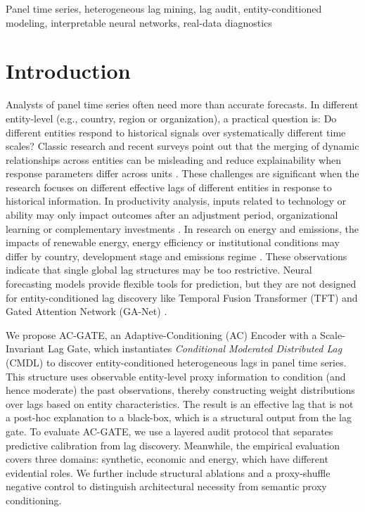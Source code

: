 \documentclass[conference]{IEEEtran}
\begin{document}
\begin{IEEEkeywords}
Panel time series, heterogeneous lag mining, lag audit, entity-conditioned modeling, interpretable neural networks, real-data diagnostics
\end{IEEEkeywords}

\section{Introduction}
Analysts of panel time series often need more than accurate forecasts. In different entity-level (e.g., country, region or organization), a practical question is: Do different entities respond to historical signals over systematically different time scales? Classic research and recent surveys point out that the merging of dynamic relationships across entities can be misleading and reduce explainability when response parameters differ across units \cite{pesaran1995pmg,thayasivam2025panelsurvey}. These challenges are significant when the research focuses on different effective lags of different entities in response to historical information. In productivity analysis, inputs related to technology or ability may only impact outcomes after an adjustment period, organizational learning or complementary investments \cite{schweikl2020lessons}. In research on energy and emissions, the impacts of renewable energy, energy efficiency or institutional conditions may differ by country, development stage and emissions regime \cite{akram2020energy,mirziyoyeva2022re}. These observations indicate that single global lag structures may be too restrictive. Neural forecasting models provide flexible tools for prediction, but they are not designed for entity-conditioned lag discovery like Temporal Fusion Transformer (TFT) \cite{lim2021tft} and Gated Attention Network (GA-Net) \cite{xue2020gated}.

We propose AC-GATE, an Adaptive-Conditioning (AC) Encoder with a Scale-Invariant Lag Gate, which instantiates \emph{Conditional Moderated Distributed Lag} (CMDL) to discover entity-conditioned heterogeneous lags in panel time series. This structure uses observable entity-level proxy information to condition (and hence moderate) the past observations, thereby constructing weight distributions over lags based on entity characteristics. The result is an effective lag that is not a post-hoc explanation to a black-box, which is a structural output from the lag gate. To evaluate AC-GATE, we use a layered audit protocol that separates predictive calibration from lag discovery. Meanwhile, the empirical evaluation covers three domains: synthetic, economic and energy, which have different evidential roles. We further include structural ablations and a proxy-shuffle negative control to distinguish architectural necessity from semantic proxy conditioning.
\end{document}
